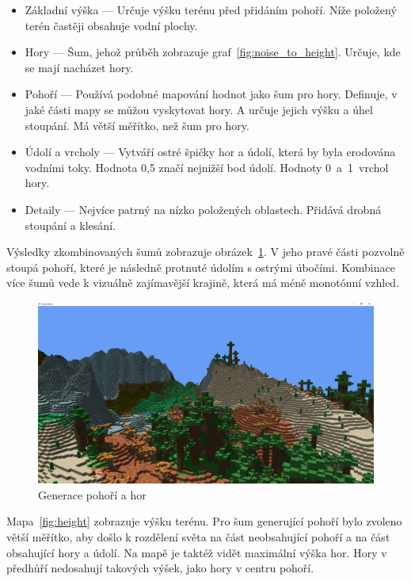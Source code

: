 \documentclass[thesis=M,czech]{FITthesis}[2019/12/23]
\begin{document}
\begin{itemize}
\item Základní výška --- Určuje výšku terénu před přidáním pohoří. Níže položený terén častěji obsahuje vodní plochy.

\item Hory --- Šum, jehož průběh zobrazuje graf~\ref{fig:noise_to_height}. Určuje, kde se mají nacházet hory.

\item Pohoří --- Používá podobné mapování hodnot jako šum pro hory. Definuje, v jaké části mapy se můžou vyskytovat hory. A určuje jejich výšku a úhel stoupání. Má větší měřítko, než šum pro hory. 

\item Údolí a vrcholy --- Vytváří ostré špičky hor a údolí, která by byla erodována vodními toky. Hodnota 0,5 značí nejnižší bod údolí. Hodnoty 0~a~1~vrchol hory.

\item Detaily --- Nejvíce patrný na nízko položených oblastech. Přidává drobná stoupání a klesání.
\end{itemize}

Výsledky zkombinovaných šumů zobrazuje obrázek~\ref{fig:mountains}. V jeho pravé části pozvolně stoupá pohoří, které je následně protnuté údolím s ostrými úbočími. Kombinace více šumů vede k vizuálně zajímavější krajině, která má méně monotónní vzhled.

\begin{figure}\centering
	\includegraphics[width=\textwidth]{images/world_gen/mountains}
	\caption[Generace pohoří a hor]{Generace pohoří a hor}\label{fig:mountains}
\end{figure}

Mapa~\ref{fig:height} zobrazuje výšku terénu. Pro šum generující pohoří bylo zvoleno větší měřítko, aby došlo k rozdělení světa na část neobsahující pohoří a na část obsahující hory a údolí. Na mapě je taktéž vidět maximální výška hor. Hory v předhůří nedosahují takových výšek, jako hory v centru pohoří.
\end{document}
